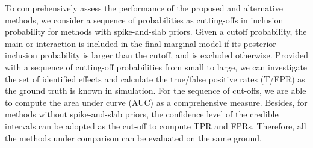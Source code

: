 \documentclass[12pt]{article}
\begin{document}



To comprehensively assess the performance of the proposed and alternative methods, we consider a sequence of probabilities as cutting-offs in inclusion probability for methods with spike-and-slab priors. Given a cutoff probability, the main or interaction is included in the final marginal model if its posterior inclusion probability is larger than the cutoff, and is excluded otherwise. Provided with a sequence of cutting-off probabilities from small to large, we can investigate the set of identified effects and calculate the true/false positive rates (T/FPR) as the ground truth is known in simulation. For the sequence of cut-offs, we are able to compute the area under curve (AUC) as a comprehensive measure. Besides, for methods without spike-and-slab priors, the confidence level of the credible intervals can be adopted as the cut-off to compute TPR and FPRs. Therefore, all the methods under comparison can be evaluated on the same ground.     
\end{document}
